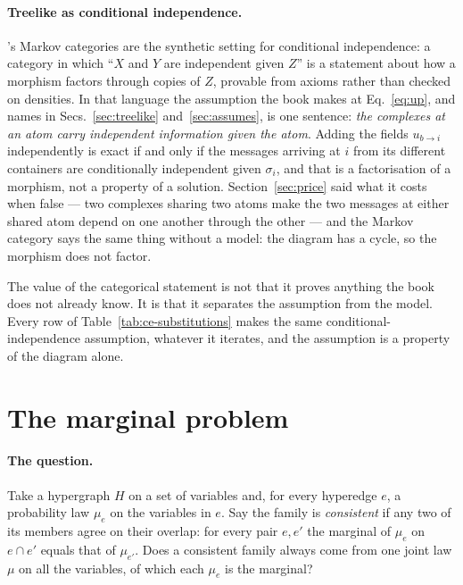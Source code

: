 \paragraph{Treelike as conditional independence.}
\citet{fritz2020}'s Markov categories are the synthetic setting for
conditional independence: a category in which ``$X$ and $Y$ are independent
given $Z$'' is a statement about how a morphism factors through copies of
$Z$, provable from axioms rather than checked on densities. In that language
the assumption the book makes at Eq.~\eqref{eq:up}, and names in
Secs.~\ref{sec:treelike} and~\ref{sec:assumes}, is one sentence: \emph{the
complexes at an atom carry independent information given the atom}. Adding
the fields $u_{b\to i}$ independently is exact if and only if the
messages arriving at $i$ from its different containers are conditionally
independent given $\sigma_{i}$, and that is a factorisation of a morphism,
not a property of a solution. Section~\ref{sec:price} said what it costs when
false --- two complexes sharing two atoms make the two messages at either
shared atom depend on one another through the other --- and the Markov
category says the same thing without a model: the diagram has a cycle, so the
morphism does not factor.

The value of the categorical statement is not that it proves anything the
book does not already know. It is that it separates the assumption from the
model. Every row of Table~\ref{tab:ce-substitutions} makes the same
conditional-independence assumption, whatever it iterates, and the assumption
is a property of the diagram alone.

\section{The marginal problem}
\label{sec:mg-marginal}

\paragraph{The question.} Take a hypergraph $H$ on a set of variables and,
for every hyperedge $e$, a probability law $\mu_{e}$ on the variables in
$e$. Say the family is \emph{consistent} if any two of its members agree on
their overlap: for every pair $e,e'$ the marginal of $\mu_{e}$ on $e\cap e'$
equals that of $\mu_{e'}$. Does a consistent family always come from one
joint law $\mu$ on all the variables, of which each $\mu_{e}$ is the
marginal?

